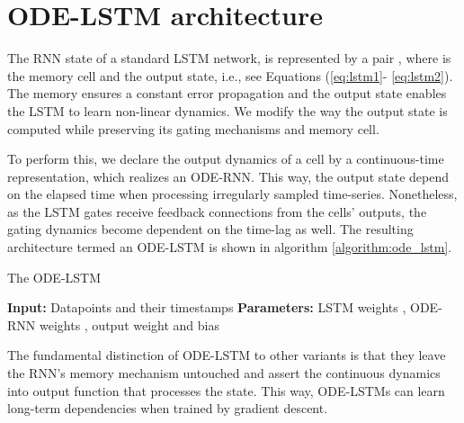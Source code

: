 \documentclass{article}
\begin{document}
\section{ODE-LSTM architecture}
The RNN state of a standard LSTM network, is represented by a pair , where  is the memory cell and  the output state, i.e., see Equations (\ref{eq:lstm1}- \ref{eq:lstm2}). The memory  ensures a constant error propagation and the output state  enables the LSTM to learn non-linear dynamics. We modify the way the output state  is computed while preserving its gating mechanisms and memory cell.

To perform this, we declare the output dynamics of a cell by a continuous-time representation, which realizes an ODE-RNN. This way, the output state depend on the elapsed time when processing irregularly sampled time-series. Nonetheless, as the LSTM gates receive feedback connections from the cells' outputs, the gating dynamics become dependent on the time-lag as well. The resulting architecture termed an ODE-LSTM is shown in algorithm \ref{algorithm:ode_lstm}. 

\begin{algorithm}[t]
\caption{The ODE-LSTM}
\label{algorithm:ode_lstm}
\begin{algorithmic}
\STATE \textbf{Input:} Datapoints and their timestamps 
\STATE \textbf{Parameters:} LSTM weights , ODE-RNN weights , output weight and bias  
\STATE  {}
\STATE  {}
\FOR{} 
\STATE 
\STATE  {}
\STATE 
\ENDFOR
\RETURN 
\end{algorithmic}
\end{algorithm}

The fundamental distinction of ODE-LSTM to other variants is that they leave the RNN's memory mechanism untouched and assert the continuous dynamics into output function that processes the state. This way, ODE-LSTMs can learn long-term dependencies when trained by gradient descent. 
\end{document}
